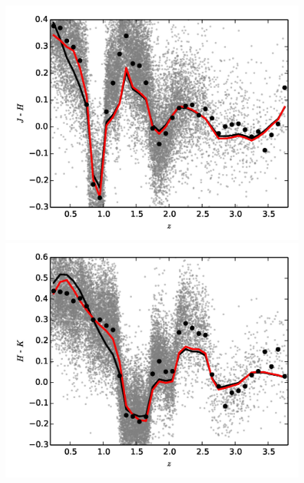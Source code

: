 \begin{figure}
  \centering
  \begin{minipage}[b]{0.49\textwidth}
    \includegraphics[width=\textwidth]{figures/chapter06/jh.jpg}
  \end{minipage}
  \begin{minipage}[b]{0.49\textwidth}
    \includegraphics[width=\textwidth]{figures/chapter06/hk.jpg}
  \end{minipage} \\
\begin{minipage}[b]{0.49\textwidth}

\end{minipage}
\end{figure}

